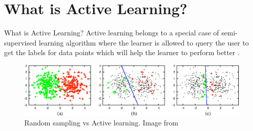 \documentclass{beamer}
\begin{document}
\section{What is Active Learning?}
\begin{frame}{What is Active Learning?}
Active learning belongs to a special case of semi-supervised learning algorithm	where the learner is allowed to query the user to get the labels for data points which will help the learner to perform better \cite{Settles2010}.  
		\begin{figure}[!htb]
			\centering
			\includegraphics[scale=0.30]{images/what_ai}
			\caption{Random sampling vs Active learning. Image from \cite{Settles2010}}
			\label{auto_workflow}
		\end{figure}
	
%				
%				
\end{frame}





\end{document}
